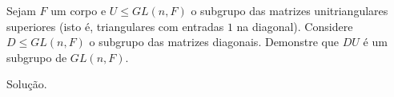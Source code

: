 \begin{homeworkProblem}
  Sejam $F$ um corpo e $U \leq GL(n,F)$ o subgrupo das matrizes unitriangulares superiores (isto é, triangulares com entradas $1$ na diagonal). Considere $D \leq GL(n,F)$ o subgrupo das matrizes diagonais. Demonstre que $DU$ é um subgrupo de $GL(n,F)$.
  \begin{solution}
    Solução.
  \end{solution}
\end{homeworkProblem}
